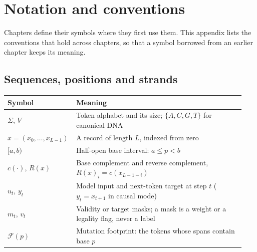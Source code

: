 \chapter{Notation and conventions}
\label{book:appendixB}

Chapters define their symbols where they first use them. This appendix lists the
conventions that hold across chapters, so that a symbol borrowed from an earlier
chapter keeps its meaning.

\section{Sequences, positions and strands}
\begin{center}\small
\begin{tabular}{@{}P{0.24\linewidth}P{0.70\linewidth}@{}}
\toprule
Symbol & Meaning\\\midrule
$\Sigma$, $V$ & Token alphabet and its size; $\{A,C,G,T\}$ for canonical DNA\\
$x=(x_0,\ldots,x_{L-1})$ & A record of length $L$, indexed from zero\\
$[a,b)$ & Half-open base interval: $a\le p<b$\\
$c(\cdot)$, $R(x)$ & Base complement and reverse complement, $R(x)_i=c(x_{L-1-i})$\\
$u_t$, $y_t$ & Model input and next-token target at step $t$ ($y_t=x_{t+1}$ in causal mode)\\
$m_t$, $v_t$ & Validity or target masks; a mask is a weight or a legality flag, never a label\\
$\mathcal F(p)$ & Mutation footprint: the tokens whose spans contain base $p$\\
\bottomrule
\end{tabular}
\end{center}

